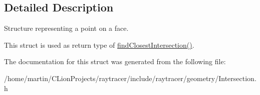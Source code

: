 \subsection{Detailed Description}
Structure representing a point on a face. 

This struct is used as return type of \hyperlink{namespaceraytracer_a82c9cab83ec5d18dca4be1b2cbde9dd2}{find\+Closest\+Intersection()}. 

The documentation for this struct was generated from the following file\+:\begin{DoxyCompactItemize}
\item 
/home/martin/\+C\+Lion\+Projects/raytracer/include/raytracer/geometry/Intersection.\+h\end{DoxyCompactItemize}
